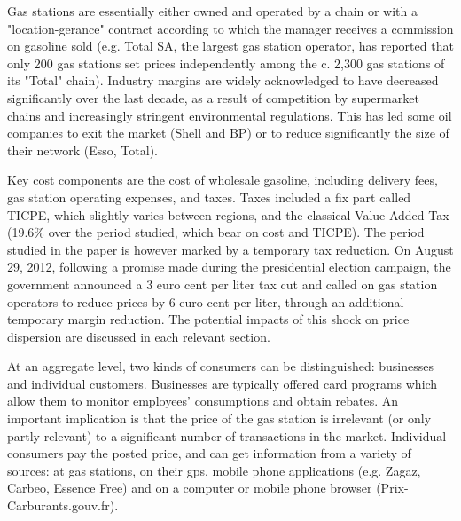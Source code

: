\documentclass[english]{article}
\begin{document}
Gas stations are essentially either owned and operated by a chain or with a "location-gerance" contract according to which the manager receives a commission on gasoline sold (e.g. Total SA, the largest gas station operator, has reported that only 200 gas stations set prices independently among the c. 2,300 gas stations of its "Total" chain). Industry margins are widely acknowledged to have decreased significantly over the last decade, as a result of competition by supermarket chains and increasingly stringent environmental regulations. This has led some oil companies to exit the market (Shell and BP) or to reduce significantly the size of their network (Esso, Total).

Key cost components are the cost of wholesale gasoline, including delivery fees,  gas station operating expenses, and taxes. Taxes included a fix part called TICPE, which slightly varies between regions, and the classical Value-Added Tax (19.6\% over the period studied, which bear on cost and TICPE). The period studied in the paper is however marked by a temporary tax reduction. On August 29, 2012, following a promise made during the presidential election campaign, the government announced a 3 euro cent per liter tax cut and called on gas station operators to reduce prices by 6 euro cent per liter, through an additional temporary margin reduction. The potential impacts of this shock on price dispersion are discussed in each relevant section.

At an aggregate level, two kinds of consumers can be distinguished: businesses and individual customers. Businesses are typically offered card programs which allow them to monitor employees' consumptions and obtain rebates. An important implication is that the price of the gas station is irrelevant (or only partly relevant) to a significant number of transactions in the market. Individual consumers pay the posted price, and can get information from a variety of sources: at gas stations, on their gps, mobile phone applications (e.g. Zagaz, Carbeo, Essence Free) and on a computer or mobile phone browser (Prix-Carburants.gouv.fr).
\end{document}
